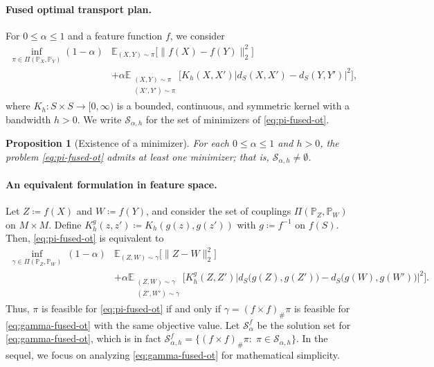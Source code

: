 \documentclass{article}
\newtheorem{proposition}{Proposition}
\begin{document}
\paragraph{Fused optimal transport plan.}
For $0\le \alpha\le 1$ and a feature function $f$, we consider
\begin{align}
	\label{eq:pi-fused-ot}
	\inf_{\pi\in\Pi(\mathbb{P}_X,\mathbb{P}_Y)} 
	(1-\alpha)&\mathbb{E}_{(X,Y)\sim\pi}\big[\|f(X)-f(Y)\|_2^2\big] \nonumber\\
	&+ \alpha\mathbb{E}_{\substack{(X,Y)\sim\pi\\(X',Y')\sim\pi}}
	\Big[K_h(X,X') \big|d_S(X,X')-d_S(Y,Y')\big|^2\Big],
\end{align}
where $K_h:S\times S\to[0,\infty)$ is a bounded, continuous, and symmetric kernel with a bandwidth $h > 0$. We write $\mathcal{S}_{\alpha,h}$ for the set of minimizers of \eqref{eq:pi-fused-ot}.

\begin{proposition}[Existence of a minimizer]
	\label{prop:existence}
	For each $0\le \alpha\le 1$ and $h > 0$, the problem \eqref{eq:pi-fused-ot} admits at least one minimizer; that is, $\mathcal{S}_{\alpha,h}\neq\emptyset$.
\end{proposition}


\paragraph{An equivalent formulation in feature space.}
Let $Z\coloneqq f(X)$ and $W \coloneqq f(Y)$, and consider the set of couplings $\Pi(\mathbb{P}_Z,\mathbb{P}_W)$ on $M\times M$. 
Define $K_h^g(z,z')\coloneqq K_h(g(z),g(z'))$ with $g \coloneqq f^{-1}$ on $f(S)$. 
Then, \eqref{eq:pi-fused-ot} is equivalent to
\begin{align}
	\label{eq:gamma-fused-ot}
	\inf_{\gamma\in\Pi(\mathbb{P}_Z,\mathbb{P}_W)}\ 
	(1-\alpha)&\mathbb{E}_{(Z,W)\sim\gamma}\big[\|Z-W\|_2^2\big] \nonumber\\
	&+ \alpha\mathbb{E}_{\substack{(Z,W)\sim\gamma\\(Z',W')\sim\gamma}}
	\!\Big[K_h^g(Z,Z')\big|d_S\big(g(Z),g(Z')\big)-d_S\big(g(W),g(W')\big)\big|^2\Big].
\end{align}
Thus, $\pi$ is feasible for \eqref{eq:pi-fused-ot} if and only if $\gamma=(f\times f)_\#\pi$ is feasible for \eqref{eq:gamma-fused-ot} with the same objective value. Let $\mathcal{S}^f_\alpha$ be the solution set for \eqref{eq:gamma-fused-ot}, which is in fact $\mathcal{S}^f_{\alpha,h} = \{(f \times f)_{\#}\pi : \;\pi \in \mathcal{S}_{\alpha,h}\}$. In the sequel, we focus on analyzing \eqref{eq:gamma-fused-ot} for mathematical simplicity.
\end{document}
